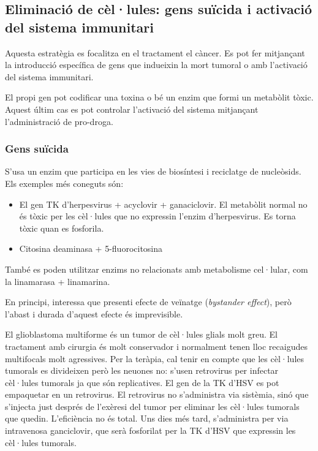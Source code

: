 

\subsection{Eliminació de cèl·lules: gens suïcida i activació del
  sistema immunitari}
\label{sec:elim-de-cel.l}
Aquesta estratègia es focalitza en el tractament el càncer. Es pot fer
mitjançant la introducció específica de gens que indueixin la mort
tumoral o amb l'activació del sistema immunitari.

El propi gen pot codificar una toxina o bé un enzim que formi un
metabòlit tòxic. Aquest últim cas es pot controlar l'activació del
sistema mitjançant l'administració de pro-droga.

\subsubsection{Gens suïcida}
\label{sec:gens-suicida}
S'usa un enzim que participa en les vies de biosíntesi i reciclatge de
nucleòsids. Els exemples més coneguts són:
\begin{itemize}
\item El gen TK d'herpesvirus + acyclovir + ganaciclovir. El metabòlit
  normal no és tòxic per les cèl·lules que no expressin l'enzim
  d'herpesvirus. Es torna tòxic quan es fosforila.

\item Citosina deaminasa + 5-fluorocitosina
\end{itemize}

També es poden utilitzar enzims no relacionats amb metabolisme
cel·lular, com la linamarasa + linamarina.

En principi, interessa que presenti efecte de veïnatge (\textit{bystander
effect}), però l'abast i durada d'aquest efecte és imprevisible.

El glioblastoma multiforme és un tumor de cèl·lules glials molt greu. El
tractament amb cirurgia és molt conservador i normalment tenen lloc
recaigudes multifocals molt agressives. Per la teràpia, cal tenir en
compte que les cèl·lules tumorals es divideixen però les neuones no:
s'usen retrovirus per infectar cèl·lules tumorals ja que són
replicatives. El gen de la TK d'HSV es pot empaquetar en un
retrovirus. El retrovirus no s'administra via sistèmia, sinó que
s'injecta just després de l'exèresi del tumor per eliminar les
cèl·lules tumorals que quedin. L'eficiència no és total. Uns dies més
tard, s'administra per via intravenosa ganciclovir, que serà
fosforilat per la TK d'HSV  que expressin les cèl·lules tumorals. 

